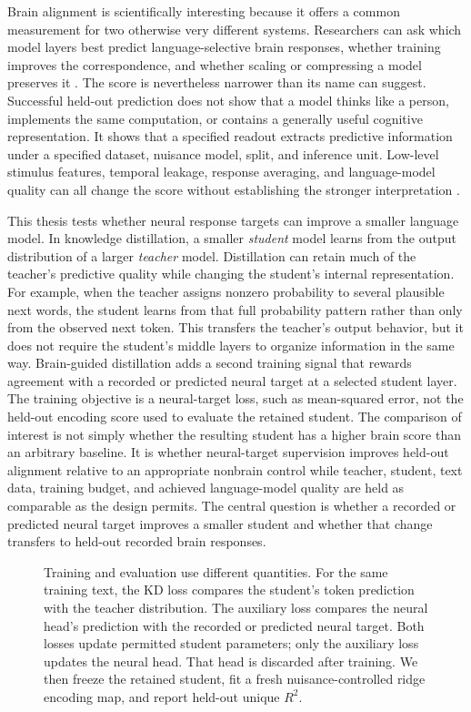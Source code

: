 Brain alignment is scientifically interesting because it offers a common measurement for two otherwise very different systems.
Researchers can ask which model layers best predict language-selective brain responses, whether training improves the correspondence, and whether scaling or compressing a model preserves it \autocite{tuckute2024,oota2023,merlin2024,oota2026}.
The score is nevertheless narrower than its name can suggest.
Successful held-out prediction does not show that a model thinks like a person, implements the same computation, or contains a generally useful cognitive representation.
It shows that a specified readout extracts predictive information under a specified dataset, nuisance model, split, and inference unit.
Low-level stimulus features, temporal leakage, response averaging, and language-model quality can all change the score without establishing the stronger interpretation \autocite{oota2024,hadidi2026,jia2026}.

This thesis tests whether neural response targets can improve a smaller language model.
In knowledge distillation, a smaller \emph{student} model learns from the output distribution of a larger \emph{teacher} model.
Distillation can retain much of the teacher's predictive quality while changing the student's internal representation.
For example, when the teacher assigns nonzero probability to several plausible next words, the student learns from that full probability pattern rather than only from the observed next token.
This transfers the teacher's output behavior, but it does not require the student's middle layers to organize information in the same way.
Brain-guided distillation adds a second training signal that rewards agreement with a recorded or predicted neural target at a selected student layer.
The training objective is a neural-target loss, such as mean-squared error, not the held-out encoding score used to evaluate the retained student.
The comparison of interest is not simply whether the resulting student has a higher brain score than an arbitrary baseline.
It is whether neural-target supervision improves held-out alignment relative to an appropriate nonbrain control while teacher, student, text data, training budget, and achieved language-model quality are held as comparable as the design permits.
The central question is whether a recorded or predicted neural target improves a smaller student and whether that change transfers to held-out recorded brain responses.

\begin{figure}[t]
  \centering
  \resizebox{0.98\textwidth}{!}{}
  \caption{Training and evaluation use different quantities. For the same training text, the KD loss compares the student's token prediction with the teacher distribution. The auxiliary loss compares the neural head's prediction with the recorded or predicted neural target. Both losses update permitted student parameters; only the auxiliary loss updates the neural head. That head is discarded after training. We then freeze the retained student, fit a fresh nuisance-controlled ridge encoding map, and report held-out unique $R^2$.}
  \label{fig:pipeline}
\end{figure}

